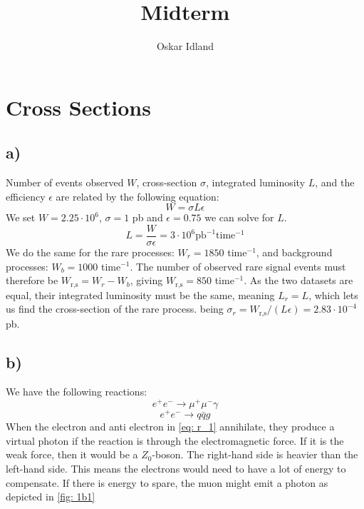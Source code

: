 \documentclass{article}
\author{Oskar Idland}
\title{Midterm}
\date{}
\begin{document}
\maketitle
\newpage

\section{Cross Sections}
\subsection*{a)}
Number of events observed $W$, cross-section $σ$, integrated luminosity $L$, and the efficiency $ϵ$ are related by the following equation:
\begin{equation}\label{eq: W}
W = σLϵ
\end{equation}
We set $W = 2.25 ⋅ 10^{6}$, $σ = 1$ pb and $ϵ = 0.75$ we can solve for $L$. 
\begin{equation}\label{eq: L}
  L = \frac{W}{σϵ} = 3 ⋅ 10^{6} \text{pb}^{-1} \text{time}^{-1} 
\end{equation}
We do the same for the rare processes:  $W_{r} = 1850$ time$^{-1}$, and background processes: $W_{b} = 1000$ time$^{-1}$. The number of observed rare signal events must therefore be $W_{\text{r,s}} = W_r - W_{b}$, giving $W_{\text{r,s}} = 850$ time$^{-1}$. As the two datasets are equal, their integrated luminosity must be the same, meaning $L_r = L$, which lets us find the cross-section of the rare process. being $σ_r = W_{\text{r,s}} / (Lϵ) = 2.83 ⋅ 10^{-4}$ pb.

\subsection*{b)}
We have the following reactions:
\begin{equation}\label{eq: r_1}
e^{+}e^{-} → μ^{+}μ^{-} γ
\end{equation}
\begin{equation}\label{eq: r_2}
e^{+}e^{-} → q \bar{q}g
\end{equation}
When the electron and anti electron in \cref{eq: r_1} annihilate, they produce a virtual photon if the reaction is through the electromagnetic force. If it is the weak force, then it would be a $Z_0$-boson. The right-hand side is heavier than the left-hand side. This means the electrons would need to have a lot of energy to compensate. If there is energy to spare, the muon might emit a photon as depicted in \cref{fig: 1b1}
\end{document}
